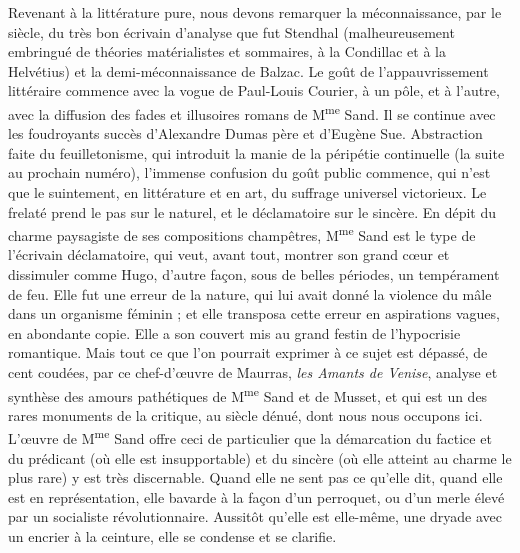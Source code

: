 \documentclass[french,twoside]{book} %
\begin{document}
Revenant à la littérature pure, nous devons remarquer la méconnaissance, par le siècle, du très bon écrivain d’analyse que fut Stendhal (malheureusement embringué de théories matérialistes et sommaires, à la Condillac et à la Helvétius) et la demi-méconnaissance de Balzac. Le goût de l’appauvrissement littéraire commence avec la vogue de Paul-Louis Courier, à un pôle, et à l’autre, avec la diffusion des fades et illusoires romans de M\textsuperscript{me} Sand. Il se continue avec les foudroyants succès d’Alexandre Dumas père et d’Eugène Sue. Abstraction faite du feuilletonisme, qui introduit la manie de la péripétie continuelle (la suite au prochain numéro), l’immense confusion du goût public commence, qui n’est que le suintement, en littérature et en art, du suffrage universel victorieux. Le frelaté prend le pas sur le naturel, et le déclamatoire sur le sincère. En dépit du charme paysagiste de ses compositions champêtres, M\textsuperscript{me} Sand est le type de l’écrivain déclamatoire, qui veut, avant tout, montrer son grand cœur et dissimuler comme Hugo, d’autre façon, sous de belles périodes, un tempérament de feu. Elle fut une erreur de la nature, qui lui avait donné la violence du mâle dans un organisme féminin ; et elle transposa cette erreur en aspirations vagues, en abondante copie. Elle a son couvert mis au grand festin de l’hypocrisie romantique. Mais tout ce que l’on pourrait exprimer à ce sujet est dépassé, de cent coudées, par ce chef-d’œuvre de Maurras, {\itshape les Amants de Venise}, analyse et synthèse des amours pathétiques de M\textsuperscript{me} Sand et de Musset, et qui est un des rares monuments de la critique, au siècle dénué, dont nous nous occupons ici. L’œuvre de M\textsuperscript{me} Sand offre ceci de particulier que la démarcation du factice et du prédicant (où elle est insupportable) et du sincère (où elle atteint au charme le plus rare) y est très discernable. Quand elle ne sent pas ce qu’elle dit, quand elle est en représentation, elle bavarde à la façon d’un perroquet, ou d’un merle élevé par un socialiste révolutionnaire. Aussitôt qu’elle est elle-même, une dryade avec un encrier à la ceinture, elle se condense et se clarifie.\par
\end{document}
